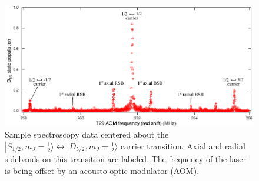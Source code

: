 \begin{figure}[t]
    \begin{center}
        \includegraphics{figures/2/Fig_729spec}
        \caption{\label{fig:729spec} Sample spectroscopy data centered about the $|S_{1/2}, m_J = \frac{1}{2} \rangle \leftrightarrow |D_{5/2}, m_J = \frac{1}{2} \rangle$ carrier transition. Axial and radial sidebands on this transition are labeled. The frequency of the laser is being offset by an acousto-optic modulator (AOM).  }
    \end{center}
\end{figure}

